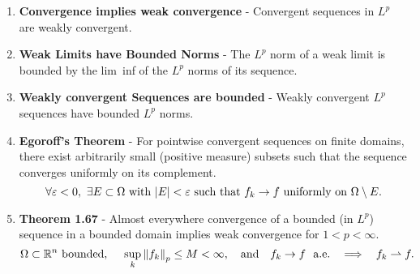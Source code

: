 \documentclass{article}
\newcommand{\E}{\varepsilon}
\begin{document}
\begin{enumerate}
        \item \textbf{Convergence implies weak convergence} - Convergent sequences in $L^p$ are weakly convergent.
        \item \textbf{Weak Limits have Bounded Norms} - The $L^p$ norm of a weak limit is bounded by the lim~inf of the $L^p$ norms of its sequence.
        \item \textbf{Weakly convergent Sequences are bounded} - Weakly convergent $L^p$ sequences have bounded $L^p$ norms.
        \item \textbf{Egoroff's Theorem} - For pointwise convergent sequences on finite domains, there exist arbitrarily small (positive measure) subsets such that the sequence converges uniformly on its complement. $$\forall \E < 0,\ \exists E \subset \Omega\ \text{with}\ \abs{E} < \E\ \text{such that}\ f_k \rightarrow f\ \text{uniformly on}\ \Omega\setminus E.$$
        \item \textbf{Theorem 1.67} - Almost everywhere convergence of a bounded (in $L^p$) sequence in a bounded domain implies weak convergence for $1 < p < \infty$. $$\Omega \subset \mathbb{R}^n\ \text{bounded},\ \ \ \ \sup_{k}\norm{f_k}_p \leq M < \infty,\ \ \ \text{and}\ \ \ f_k \rightarrow f\ \text{ a.e.}\ \ \implies\ \ f_k \rightharpoonup f.$$
    \end{enumerate}
\end{document}
